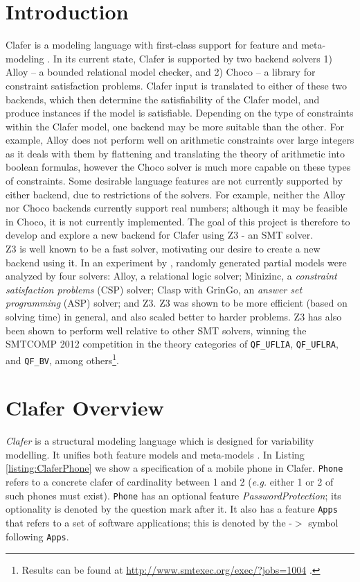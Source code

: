\documentclass{article}
\newcommand{\eg}{\emph{e.g.}\xspace}
\begin{document}
\section{Introduction}
Clafer is a modeling language with first-class support for feature and meta-modeling \cite{BakClaferSLE2010}. In its current state, Clafer is supported by two backend solvers 1) Alloy -- a bounded relational model checker, and 2) Choco -- a library for constraint satisfaction problems. Clafer input is translated to either of these two backends, which then determine the satisfiability of the Clafer model, and produce instances if the model is satisfiable. Depending on the type of constraints within the Clafer model, one backend may be more suitable than the other. For example, Alloy does not perform well on arithmetic constraints over large integers as it deals with them by flattening and translating the theory of arithmetic into boolean formulas, however the Choco solver is much more capable on these types of constraints. Some desirable language features are not currently supported by either backend, due to restrictions of the solvers. For example, neither the Alloy nor Choco backends currently support real numbers; although it may be feasible in Choco, it is not currently implemented. The goal of this project is therefore to  develop and explore a new backend for Clafer using Z3 - an SMT solver. \\
\indent Z3 is well known to be a fast solver, motivating our desire to create a new backend using it. In an experiment by \cite{Saadatpanah2012}, randomly generated partial models were analyzed by four solvers: Alloy, a relational logic solver; Minizinc, a  \textit{constraint satisfaction problems} (CSP) solver; Clasp with GrinGo, an \textit{answer set programming} (ASP) solver; and Z3. Z3 was shown to be more efficient (based on solving time) in general, and also scaled better to harder problems. Z3 has also been shown to perform well relative to other SMT solvers, winning the SMTCOMP 2012 competition in the theory categories of \texttt{QF\_UFLIA}, \texttt{QF\_UFLRA}, and \texttt{QF\_BV}, among others\footnote{Results can be found at \url{http://www.smtexec.org/exec/?jobs=1004} .}.

\section{Clafer Overview}

\emph{Clafer} is a structural modeling language which is designed for variability modelling. It unifies both feature models  and meta-models \cite{BakClaferSLE2010}.
%
In Listing \ref{listing:ClaferPhone}  we show a specification of a mobile phone in Clafer. 
%
\texttt{Phone} refers to a concrete clafer of cardinality between 1 and 2 (\eg either 1 or 2 of such phones must exist). \texttt{Phone} has an optional feature \emph{PasswordProtection}; its optionality is denoted by the question mark after it. It also has  a feature \texttt{Apps} that refers  to a set of software applications; this is denoted by the  -$>$ symbol following  \texttt{Apps}. 
\end{document}
